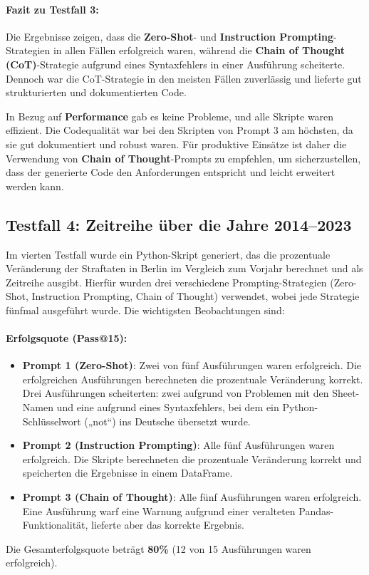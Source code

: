 \documentclass[11pt,a4paper]{article}
\begin{document}
\paragraph{Fazit zu Testfall 3:}
Die Ergebnisse zeigen, dass die \textbf{Zero-Shot}- und \textbf{Instruction Prompting}-Strategien in allen Fällen erfolgreich waren, während die \textbf{Chain of Thought (CoT)}-Strategie aufgrund eines Syntaxfehlers in einer Ausführung scheiterte. Dennoch war die CoT-Strategie in den meisten Fällen zuverlässig und lieferte gut strukturierten und dokumentierten Code. 

In Bezug auf \textbf{Performance} gab es keine Probleme, und alle Skripte waren effizient. Die Codequalität war bei den Skripten von Prompt 3 am höchsten, da sie gut dokumentiert und robust waren. Für produktive Einsätze ist daher die Verwendung von \textbf{Chain of Thought}-Prompts zu empfehlen, um sicherzustellen, dass der generierte Code den Anforderungen entspricht und leicht erweitert werden kann.

\subsection{Testfall 4: Zeitreihe über die Jahre 2014--2023}
\label{subsec:auswertung_testfall4}

Im vierten Testfall wurde ein Python-Skript generiert, das die prozentuale Veränderung der Straftaten in Berlin im Vergleich zum Vorjahr berechnet und als Zeitreihe ausgibt. Hierfür wurden drei verschiedene Prompting-Strategien (Zero-Shot, Instruction Prompting, Chain of Thought) verwendet, wobei jede Strategie fünfmal ausgeführt wurde. Die wichtigsten Beobachtungen sind:

\paragraph{Erfolgsquote (Pass@15):}
\begin{itemize}
    \item \textbf{Prompt 1 (Zero-Shot)}: Zwei von fünf Ausführungen waren erfolgreich. Die erfolgreichen Ausführungen berechneten die prozentuale Veränderung korrekt. Drei Ausführungen scheiterten: zwei aufgrund von Problemen mit den Sheet-Namen und eine aufgrund eines Syntaxfehlers, bei dem ein Python-Schlüsselwort („not“) ins Deutsche übersetzt wurde.
    \item \textbf{Prompt 2 (Instruction Prompting)}: Alle fünf Ausführungen waren erfolgreich. Die Skripte berechneten die prozentuale Veränderung korrekt und speicherten die Ergebnisse in einem DataFrame.
    \item \textbf{Prompt 3 (Chain of Thought)}: Alle fünf Ausführungen waren erfolgreich. Eine Ausführung warf eine Warnung aufgrund einer veralteten Pandas-Funktionalität, lieferte aber das korrekte Ergebnis.
\end{itemize}
Die Gesamterfolgsquote beträgt \textbf{80\%} (12 von 15 Ausführungen waren erfolgreich).
\end{document}
